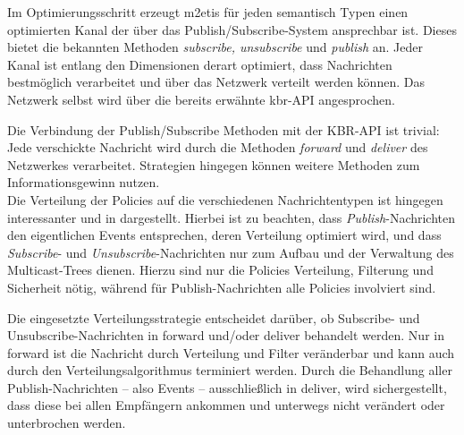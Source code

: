 Im Optimierungsschritt erzeugt \ac{m2etis} für jeden semantisch Typen einen optimierten Kanal der über das Publish/Subscribe-System ansprechbar ist. Dieses bietet die bekannten Methoden \emph{subscribe, unsubscribe} und \emph{publish} an. Jeder Kanal ist entlang den Dimensionen derart optimiert, dass Nachrichten bestmöglich verarbeitet und über das Netzwerk verteilt werden können. Das Netzwerk selbst wird über die bereits erwähnte \ac{kbr}-API angesprochen. 

Die Verbindung der Publish/Subscribe Methoden mit der KBR-API ist trivial: Jede verschickte Nachricht wird durch die Methoden \emph{forward} und \emph{deliver} des Netzwerkes verarbeitet. Strategien hingegen können weitere Methoden zum Informationsgewinn nutzen.\\
Die Verteilung der Policies auf die verschiedenen Nachrichtentypen ist hingegen interessanter und in  dargestellt. Hierbei ist zu beachten, dass \emph{Publish}-Nachrichten den eigentlichen Events entsprechen, deren Verteilung optimiert wird, und dass \emph{Subscribe}- und \emph{Unsubscribe}-Nachrichten nur zum Aufbau und der Verwaltung des Multicast-Trees dienen. Hierzu sind nur die Policies Verteilung, Filterung und Sicherheit nötig, während für Publish-Nachrichten alle Policies involviert sind.

\begin{table}[!h]
\caption{Verbindungsmatrix}
\label{tab:verbindungsmatrix}
\end{table}

Die eingesetzte Verteilungsstrategie entscheidet darüber, ob Subscribe- und Unsubscribe-Nachrichten in forward und/oder deliver behandelt werden. Nur in forward ist die Nachricht durch Verteilung und Filter veränderbar und kann auch durch den Verteilungsalgorithmus terminiert werden. Durch die Behandlung aller Publish-Nachrichten -- also Events -- ausschließlich in deliver, wird sichergestellt, dass diese bei allen Empfängern ankommen und unterwegs nicht verändert oder unterbrochen werden.


